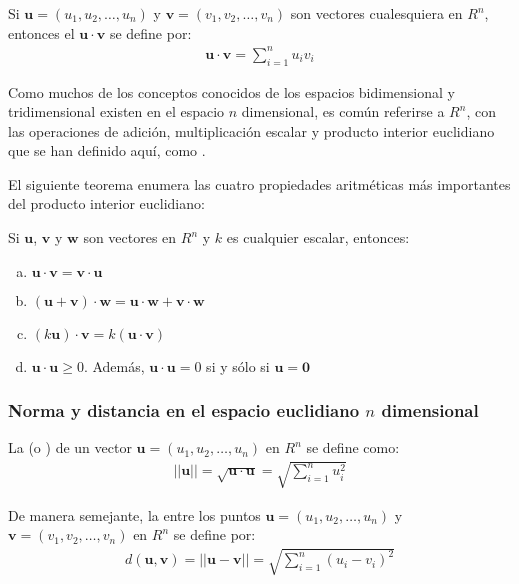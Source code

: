 \documentclass[a4paper,12pt]{article}
\begin{document}
\begin{concept}
  Si $\mathbf{u}=(u_1,u_2,\ldots,u_n)$ y $\mathbf{v}=(v_1,v_2,\ldots,v_n)$ son
  vectores cualesquiera en $R^n$, entonces el  $\mathbf{u}\cdot\mathbf{v}$ se define por:
  \begin{align*}
    \mathbf{u}\cdot\mathbf{v}=\sum_{i=1}^n u_iv_i
  \end{align*}
\end{concept}

Como muchos de los conceptos conocidos de los espacios bidimensional y
tridimensional existen en el espacio $n$ dimensional, es común referirse a
$R^n$, con las operaciones de adición, multiplicación escalar y producto
interior euclidiano que se han definido aquí, como .

El siguiente teorema enumera las cuatro propiedades aritméticas más
importantes del producto interior euclidiano:
\begin{theorem}
  Si $\mathbf{u}$, $\mathbf{v}$ y $\mathbf{w}$ son vectores en $R^n$ y
  $k$ es cualquier escalar, entonces:
  \begin{enumerate}[(a)]
    \item $\mathbf{u}\cdot\mathbf{v}=\mathbf{v}\cdot\mathbf{u}$
    \item
      $(\mathbf{u}+\mathbf{v})\cdot\mathbf{w}=\mathbf{u}\cdot\mathbf{w}+\mathbf{v}\cdot\mathbf{w}$
    \item $(k\mathbf{u})\cdot\mathbf{v}=k(\mathbf{u}\cdot\mathbf{v})$
    \item $\mathbf{u}\cdot\mathbf{u}\ge 0$. Además,
      $\mathbf{u}\cdot\mathbf{u}=0$ si y sólo si $\mathbf{u}=\mathbf{0}$
  \end{enumerate}
  \label{theo:prop_prod_int}
\end{theorem}

\subsubsection{Norma y distancia en el espacio euclidiano $n$ dimensional}

La  (o ) de un vector
$\mathbf{u}=(u_1,u_2,\ldots,u_n)$ en $R^n$ se define como:
\begin{align*}
  ||\mathbf{u}||=\sqrt{\mathbf{u}\cdot\mathbf{u}}=\sqrt{\sum_{i=1}^nu_i^2}
\end{align*}

De manera semejante, la  entre los puntos
$\mathbf{u}=(u_1,u_2,\ldots,u_n)$ y $\mathbf{v}=(v_1,v_2,\ldots,v_n)$ en
$R^n$ se define por:
\begin{align*}
  d(\mathbf{u},\mathbf{v})=||\mathbf{u}-\mathbf{v}||=\sqrt{\sum_{i=1}^n(u_i-v_i)^2}
\end{align*}
\end{document}
